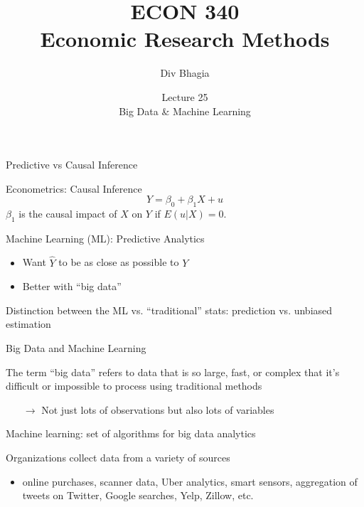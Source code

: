 \documentclass{./../div_teaching_slides}
\begin{document}
\title{ECON 340 \\ Economic Research Methods}
\author{Div Bhagia}
\date{Lecture 25 \\ Big Data \& Machine Learning}

\begin{frame}
\maketitle
\end{frame}

\begin{frame}{Predictive vs Causal Inference}
\begin{witemize}
  \item Econometrics: Causal Inference
  $$ Y = \beta_0 + \beta_1 X + u $$
 $\beta_1$ is the causal impact of $X$ on $Y$ if $E(u | X) = 0 $.
 \item Machine Learning (ML): Predictive Analytics \\
\begin{itemize}
  \normalsize
  \item Want $\hat{Y}$ to be as close as possible to $Y$
  \item Better with ``big data'' 
\end{itemize}
\item Distinction between the ML vs. ``traditional'' stats: prediction vs. unbiased estimation
\end{witemize}
\end{frame}

\begin{frame}{Big Data and Machine Learning}
\begin{witemize}
  \item The term “big data” refers to data that is so large, fast, or complex that it’s difficult or impossible to process using traditional methods 
  \begin{itemize}
  \normalsize
  \item[$\rightarrow$] Not just lots of observations but also lots of variables
  \end{itemize}
\item Machine learning: set of algorithms for big data analytics 
  \item Organizations collect data from a variety of sources \\
  \begin{itemize}
  \normalsize
  \item online purchases, scanner data, Uber analytics, smart sensors, aggregation of tweets on Twitter, Google searches, Yelp, Zillow, etc. 
\end{itemize}
\end{witemize}
\end{frame}
\end{document}

